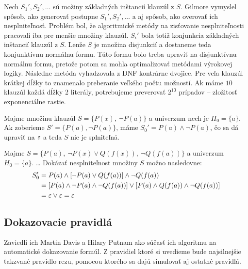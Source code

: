 \begin{poznamka}[Gilmore, 1960]
    Nech $S_1',S_2',\dots$ sú možiny základných inštancií klauzúl z
    $S$. Gilmore vymyslel spôsob, ako generovať postupne
    $S_1',S_2',\dots$ a aj spôsob, ako overovať ich nesplniteľnosť.
    Problém bol, že algoritmické metódy na zisťovanie nesplniteľnosti
    pracovali iba pre menšie množiny klauzúl.
    $S_i'$ bola totiž konjunkcia základných inštancií klauzúl z $S$.
    Lenže $S$ je množina disjunkcií a dostaneme teda
    konjunktívnu normálnu formu. Túto formu bolo treba upraviť na
    disjunktívnu normálnu formu, pretože potom sa mohla optimalizovať
    metódami výrokovej logiky. Následne metóda vyhadzovala z DNF
    kontrárne dvojice.
    Pre veľa klauzúl krátkej dĺžky to znamenalo preberanie veľkého
    počtu možností.
    Ak máme $10$ klauzúl každá dĺžky 2 literály,
    potrebujeme preverovať $2^{10}$ prípadov -- zložitosť exponenciálne
    rastie.
\end{poznamka}

\begin{priklad}
    Majme množinu klauzúl $S=\{P(x),\ \neg P(a)\}$ a
    univerzum nech je $H_0 = \{a\}$.
    Ak zoberieme $S'=\{P(a), \neg P(a)\}$,
    máme $S_0' = P(a) \land \neg P(a)$, čo sa dá upraviť na $\varepsilon$ a
    teda $S$ nie je splniteľná.
\end{priklad}


\begin{priklad}
    Majme $S=\{P(a),\ \neg P(x) \lor Q(f(x)),\ \neg Q(f(a)) \}$ a
    univerzum $H_0 = \{a\}$.
    \dots
    Dokázať nesplniteľnost množiny $S$ možno nasledovne:
    \begin{equation*}
    \begin{split}
        S_0' &=P(a)\land [\neg P(a)\lor Q(f(a))] \land \neg Q(f(a)) \\
             &=[P(a)\land \neg P(a) \land \neg Q(f(a))] \lor 
               [P(a) \land Q(f(a)) \land \neg Q(f(a))] \\
             &= \varepsilon \lor \varepsilon = \varepsilon
    \end{split}
    \end{equation*}
\end{priklad}

\subsection{Dokazovacie pravidlá}

Zaviedli ich Martin Davis a Hilary Putnam ako súčasť ich algoritmu na
automatické dokazovanie formúl. Z pravidiel ktoré si uvedieme bude
najsilnejšie takzvané pravidlo rezu, pomocou ktorého sa dajú simulovať
aj ostatné pravidlá.

